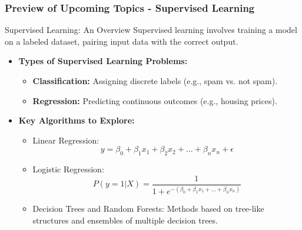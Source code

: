 \documentclass[aspectratio=169]{beamer}
\begin{document}
\begin{frame}[fragile]
  \frametitle{Preview of Upcoming Topics - Supervised Learning}
  
  \begin{block}{Supervised Learning: An Overview}
    Supervised learning involves training a model on a labeled dataset, pairing input data with the correct output.
  \end{block}

  \begin{itemize}
    \item \textbf{Types of Supervised Learning Problems:}
      \begin{itemize}
        \item \textbf{Classification:} Assigning discrete labels (e.g., spam vs. not spam).
        \item \textbf{Regression:} Predicting continuous outcomes (e.g., housing prices).
      \end{itemize}

    \item \textbf{Key Algorithms to Explore:}
      \begin{itemize}
        \item Linear Regression: 
        \begin{equation}
          y = \beta_0 + \beta_1 x_1 + \beta_2 x_2 + ... + \beta_n x_n + \epsilon
        \end{equation}
        
        \item Logistic Regression: 
        \begin{equation}
          P(y=1|X) = \frac{1}{1 + e^{-(\beta_0 + \beta_1 x_1 + ... + \beta_n x_n)}}
        \end{equation}

        \item Decision Trees and Random Forests: Methods based on tree-like structures and ensembles of multiple decision trees.
      \end{itemize}
  \end{itemize}
\end{frame}
\end{document}
